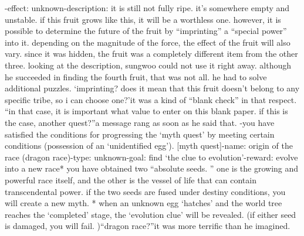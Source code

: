 -effect: unknown-description: it is still not fully ripe.
 it’s somewhere empty and unstable.
 if this fruit grows like this, it will be a worthless one.
 however, it is possible to determine the future of the fruit by “imprinting” a “special power” into it.
 depending on the magnitude of the force, the effect of the fruit will also vary.
since it was hidden, the fruit was a completely different item from the other three.
looking at the description, sungwoo could not use it right away.
although he succeeded in finding the fourth fruit, that was not all.
 he had to solve additional puzzles.
‘imprinting? does it mean that this fruit doesn’t belong to any specific tribe, so i can choose one?’it was a kind of “blank check” in that respect.
“in that case, it is important what value to enter on this blank paper.
 if this is the case, another quest?”a message rang as soon as he said that.
-you have satisfied the conditions for progressing the ‘myth quest’ by meeting certain conditions (possession of an ‘unidentified egg’).
[myth quest]-name: origin of the race (dragon race)-type: unknown-goal: find ‘the clue to evolution’-reward: evolve into a new race* you have obtained two “absolute seeds.
” one is the growing and powerful race itself, and the other is the vessel of life that can contain transcendental power.
if the two seeds are fused under destiny conditions, you will create a new myth.
* when an unknown egg ‘hatches’ and the world tree reaches the ‘completed’ stage, the ‘evolution clue’ will be revealed.
 (if either seed is damaged, you will fail.
)“dragon race?”it was more terrific than he imagined.


 